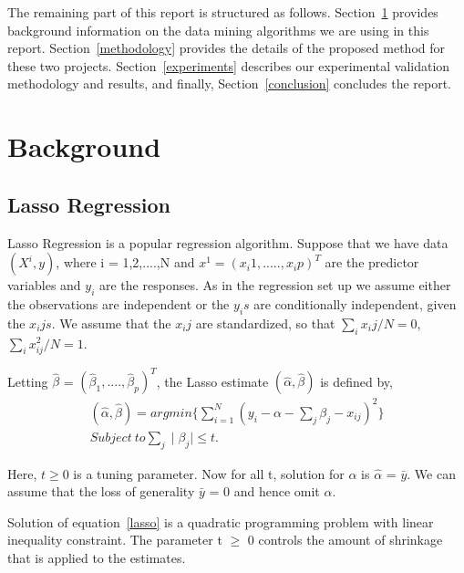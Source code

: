 \documentclass[fleqn,10pt]{SelfArx} %
\begin{document}
The remaining part of this report is structured as follows. Section~\ref{background} provides background information on the data mining algorithms we are using in this report. Section~\ref{methodology} provides the details of the proposed method for these two projects. Section~\ref{experiments} describes our experimental validation methodology and results, and finally, Section~\ref{conclusion} concludes the report.

\section{Background}\label{background}

\subsection{Lasso Regression}
Lasso Regression \cite{tibshirani1996regression} is a popular regression algorithm. Suppose that we have data $(X^i,y)$, where i = 1,2,....,N and $x^1 = (x_i1,....., x_ip)^T$ are the predictor variables and $y_i$ are the responses. As in the regression set up we assume either the observations are independent or the $y_i s$ are conditionally independent, given the $x_ij s$. We assume that the $x_ij$ are standardized, so that $\sum_i x_ij/N = 0$, $\sum_i x_{ij}^{2}/N = 1$.

Letting $\hat{\beta}$ = $(\hat{\beta}_1,...., \hat{\beta}_p )^T$, the Lasso estimate $(\hat{\alpha}, \hat{\beta})$ is defined by,
\begin{equation}\label{lasso}
    \begin{split}
(\hat{\alpha}, \hat{\beta}) = arg min\{\sum_{i=1}^{N}(y_i - \alpha - \sum_j \beta_j - x_{ij} )^2\}\\
 Subject\ to \sum_j \mid \beta_j \mid \leq t.
\end{split}
\end{equation}
 
Here, $ t \geq 0$ is a tuning parameter. Now for all t, solution for $\alpha$ is $\hat{\alpha}$ = $\bar{y}$. We can assume that the loss of generality $\bar{y}$ = 0 and hence omit $\alpha$.

Solution of equation~\ref{lasso} is a quadratic programming problem with linear inequality constraint. The parameter t $\geq$ 0 controls the amount of shrinkage that is applied to the estimates.
\end{document}
